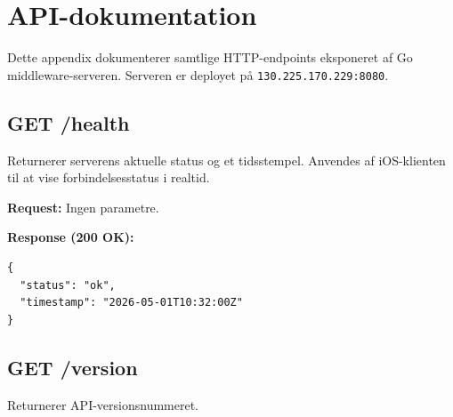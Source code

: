 \documentclass[12pt, a4paper, oneside]{report}
\begin{document}
\clearpage

\tableofcontents
\clearpage













\clearpage
\printbibliography[heading=bibintoc, title={Referencer}]

\appendix

\chapter{API-dokumentation}
\label{app:api}

Dette appendix dokumenterer samtlige HTTP-endpoints eksponeret af
Go middleware-serveren. Serveren er deployet på
\texttt{130.225.170.229:8080}.

\section*{GET /health}

Returnerer serverens aktuelle status og et tidsstempel. Anvendes
af iOS-klienten til at vise forbindelsesstatus i realtid.

\textbf{Request:} Ingen parametre.

\textbf{Response (200 OK):}
\begin{lstlisting}[language={}]
{
  "status": "ok",
  "timestamp": "2026-05-01T10:32:00Z"
}
\end{lstlisting}

\section*{GET /version}

Returnerer API-versionsnummeret.
\end{document}
